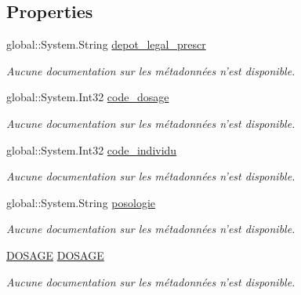\subsection*{Properties}
\begin{DoxyCompactItemize}
\item 
global\-::\-System.\-String \hyperlink{class_model_1_1_p_r_e_s_c_r_i_r_e_a9b74be9f296f7872642b907acd30f857}{depot\-\_\-legal\-\_\-prescr}
\begin{DoxyCompactList}\small\item\em Aucune documentation sur les métadonnées n'est disponible. \end{DoxyCompactList}\item 
global\-::\-System.\-Int32 \hyperlink{class_model_1_1_p_r_e_s_c_r_i_r_e_a7d149f06b9852794be2b5246e0bedaf3}{code\-\_\-dosage}
\begin{DoxyCompactList}\small\item\em Aucune documentation sur les métadonnées n'est disponible. \end{DoxyCompactList}\item 
global\-::\-System.\-Int32 \hyperlink{class_model_1_1_p_r_e_s_c_r_i_r_e_adb817829898cdf62b98e9e3ac19f43ae}{code\-\_\-individu}
\begin{DoxyCompactList}\small\item\em Aucune documentation sur les métadonnées n'est disponible. \end{DoxyCompactList}\item 
global\-::\-System.\-String \hyperlink{class_model_1_1_p_r_e_s_c_r_i_r_e_a1cf3de1e828418d612305ac1a6c62c04}{posologie}
\begin{DoxyCompactList}\small\item\em Aucune documentation sur les métadonnées n'est disponible. \end{DoxyCompactList}\item 
\hyperlink{class_model_1_1_d_o_s_a_g_e}{D\-O\-S\-A\-G\-E} \hyperlink{class_model_1_1_p_r_e_s_c_r_i_r_e_a1af2abaa082cabb9c53e3e16e1aab6ba}{D\-O\-S\-A\-G\-E}
\begin{DoxyCompactList}\small\item\em Aucune documentation sur les métadonnées n'est disponible. \end{DoxyCompactList}\item 

\end{DoxyCompactItemize}
